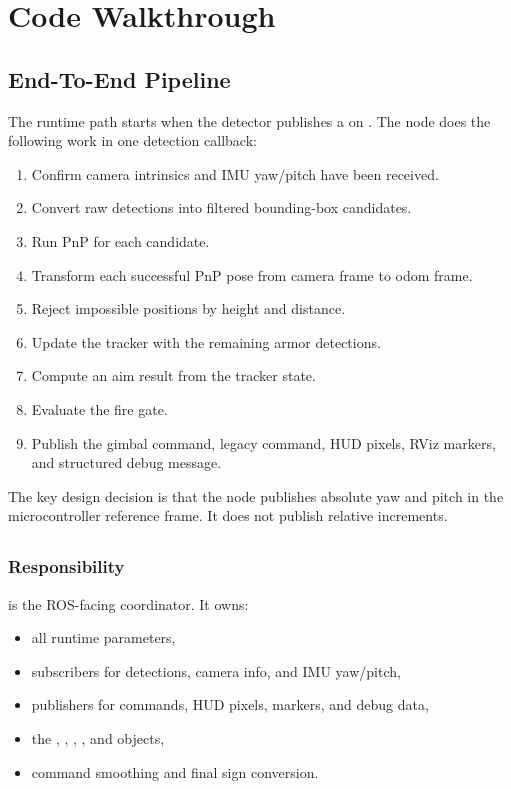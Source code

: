\chapter{Code Walkthrough}

\section{End-To-End Pipeline}

The runtime path starts when the detector publishes a
 on . The node does
the following work in one detection callback:

\begin{enumerate}
  \item Confirm camera intrinsics and IMU yaw/pitch have been received.
  \item Convert raw detections into filtered bounding-box candidates.
  \item Run PnP for each candidate.
  \item Transform each successful PnP pose from camera frame to odom frame.
  \item Reject impossible positions by height and distance.
  \item Update the tracker with the remaining armor detections.
  \item Compute an aim result from the tracker state.
  \item Evaluate the fire gate.
  \item Publish the gimbal command, legacy command, HUD pixels, RViz markers,
  and structured debug message.
\end{enumerate}

The key design decision is that the node publishes absolute yaw and pitch in
the microcontroller reference frame. It does not publish relative increments.

\section{}

\subsection{Responsibility}

 is the ROS-facing coordinator. It owns:

\begin{itemize}
  \item all runtime parameters,
  \item subscribers for detections, camera info, and IMU yaw/pitch,
  \item publishers for commands, HUD pixels, markers, and debug data,
  \item the , , ,
  , and  objects,
  \item command smoothing and final sign conversion.
\end{itemize}

